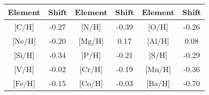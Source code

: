 \begin{tabular}{cccccc}
\hline \hline
Element & Shift & Element & Shift & Element & Shift \\
\hline
{[C/H]} & -0.27 & {[N/H]} & -0.39 & {[O/H]} & -0.26 \\
{[Ne/H]} & -0.20 & {[Mg/H]} & 0.17 & {[Al/H]} & 0.08 \\
{[Si/H]} & -0.34 & {[P/H]} & -0.21 & {[S/H]} & -0.29 \\
{[V/H]} & -0.02 & {[Cr/H]} & -0.19 & {[Mn/H]} & -0.36 \\
{[Fe/H]} & -0.15 & {[Co/H]} & -0.03 & {[Ba/H]} & -0.70 \\
\hline \hline
\end{tabular}
